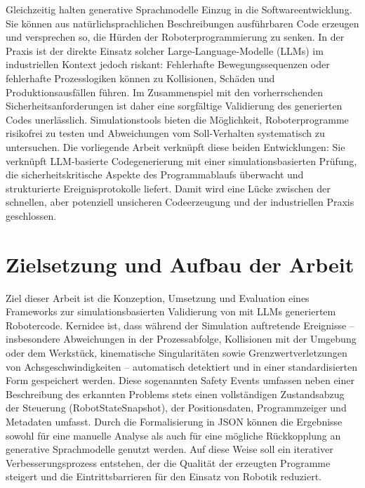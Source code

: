 Gleichzeitig halten generative Sprachmodelle Einzug in die
Softwareentwicklung. Sie können aus natürlichsprachlichen
Beschreibungen ausführbaren Code erzeugen und versprechen so, die
Hürden der Roboterprogrammierung zu senken. In der Praxis ist der
direkte Einsatz solcher Large‑Language‑Modelle (LLMs) im
industriellen Kontext jedoch riskant: Fehlerhafte Bewegungssequenzen
oder fehlerhafte Prozesslogiken können zu Kollisionen, Schäden und
Produktionsausfällen führen. Im Zusammenspiel mit den vorherrschenden
Sicherheitsanforderungen ist daher eine sorgfältige Validierung des
generierten Codes unerlässlich. Simulationstools bieten die
Möglichkeit, Roboterprogramme risikofrei zu testen und Abweichungen
vom Soll‑Verhalten systematisch zu untersuchen. Die vorliegende
Arbeit verknüpft diese beiden Entwicklungen: Sie verknüpft
LLM‑basierte Codegenerierung mit einer simulationsbasierten Prüfung,
die sicherheitskritische Aspekte des Programmablaufs überwacht und
strukturierte Ereignisprotokolle liefert. Damit wird eine Lücke
zwischen der schnellen, aber potenziell unsicheren Codeerzeugung und
der industriellen Praxis geschlossen.

\section{Zielsetzung und Aufbau der Arbeit}
\label{sec:Zielsetzung}

Ziel dieser Arbeit ist die Konzeption, Umsetzung und Evaluation eines
Frameworks zur simulationsbasierten Validierung von mit LLMs
generiertem Robotercode. Kernidee ist, dass während der Simulation
auftretende Ereignisse – insbesondere Abweichungen in der
Prozessabfolge, Kollisionen mit der Umgebung oder dem Werkstück,
kinematische Singularitäten sowie Grenzwertverletzungen von
Achsgeschwindigkeiten – automatisch detektiert und in einer
standardisierten Form gespeichert werden. Diese sogenannten Safety
Events umfassen neben einer Beschreibung des erkannten Problems stets
einen vollständigen Zustandsabzug der Steuerung (RobotStateSnapshot),
der Positionsdaten, Programmzeiger und Metadaten umfasst. Durch die
Formalisierung in JSON können die Ergebnisse sowohl für eine manuelle
Analyse als auch für eine mögliche Rückkopplung an generative
Sprachmodelle genutzt werden. Auf diese Weise soll ein iterativer
Verbesserungsprozess entstehen, der die Qualität der erzeugten
Programme steigert und die Eintrittsbarrieren für den Einsatz von
Robotik reduziert.

